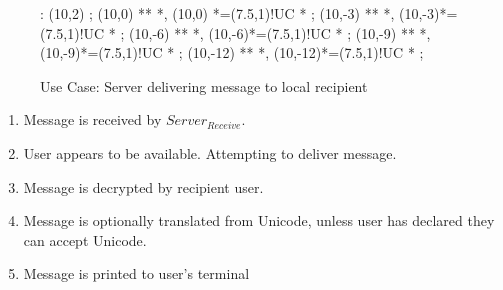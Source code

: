 \begin{figure}[Hbt]

\xy<1cm,0cm>:
(10,2) ; (10,0) **\dir{=} *\dir{>},
(10,0) *=(7.5,1)!UC *\frm{-} ;
(10,-3) **\dir{-} *\dir{>},
(10,-3)*=(7.5,1)!UC *\frm{-} ; 
(10,-6) **\dir{-} *\dir{>},
(10,-6)*=(7.5,1)!UC *\frm{-} ; 
(10,-9) **\dir{-} *\dir{>},
(10,-9)*=(7.5,1)!UC *\frm{=} ; 
(10,-12) **\dir{-} *\dir{>},
(10,-12)*=(7.5,1)!UC *\frm{-} ; 
\endxy

\caption{Use Case: Server delivering message to local recipient}

\end{figure}

\begin{enumerate}

\item Message is received by $Server_{Receive}$.

\item User appears to be available. Attempting to deliver message.

\item Message is decrypted by recipient user. 

\item Message is optionally translated from Unicode, unless user has
declared they can accept Unicode. 

\item Message is printed to user's terminal

\end{enumerate}

